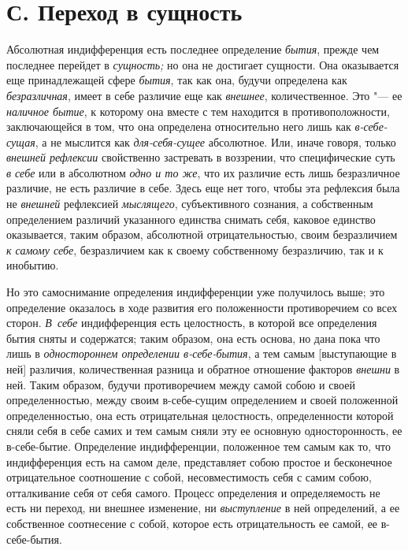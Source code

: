 \section[С. Переход в сущность]{С. Переход в сущность}
Абсолютная индифференция есть последнее
определение {\em бытия}, прежде чем последнее перейдет
в {\em сущность;} но она не достигает сущности. Она
оказывается еще принадлежащей сфере {\em бытия}, так
как она, будучи определена как {\em безразличная},
имеет в себе различие еще как {\em внешнее},
количественное. Это "--- ее {\em наличное бытие}, к
которому она вместе с тем находится в противоположности, заключающейся в
том, что она определена относительно него лишь как
{\em в-себе-сущая}, а не мыслится как
{\em для-себя-сущее} абсолютное. Или, иначе говоря,
только {\em внешней рефлексии} свойственно застревать в
воззрении, что специфические суть {\em в себе} или в
абсолютном {\em одно и то же}, что их различие есть
лишь безразличное различие, не есть различие в себе. Здесь еще нет того,
чтобы эта рефлексия была не {\em внешней} рефлексией
{\em мыслящего}, субъективного сознания, а собственным
определением различий указанного единства снимать себя, каковое единство
оказывается, таким образом, абсолютной отрицательностью, своим безразличием
{\em к самому себе}, безразличием как к своему
собственному безразличию, так и к инобытию.

Но это самоснимание определения индифференции уже получилось выше; это
определение оказалось в ходе развития его положенности противоречием со
всех сторон. {\em В~себе} индифференция есть
целостность, в которой все определения бытия сняты и содержатся; таким
образом, она есть основа, но дана пока что лишь в
{\em одностороннем определении в-себе-бытия}, а тем
самым [выступающие в ней] различия, количественная разница и обратное
отношение факторов {\em внешни} в ней. Таким образом,
будучи противоречием между самой собою и своей определенностью, между своим
в-себе-сущим определением и своей положенной определенностью, она есть
отрицательная целостность, определенности которой сняли себя в себе самих и
тем самым сняли эту ее основную односторонность, ее в-себе-бытие.
Определение индифференции, положенное тем самым как то, что индифференция
есть на самом деле, представляет собою простое и бесконечное отрицательное
соотношение с собой, несовместимость себя с самим собою, отталкивание себя
от себя самого. Процесс определения и определяемость не есть ни переход, ни
внешнее изменение, ни {\em выступление} в ней
определений, а ее собственное соотнесение с собой, которое есть
отрицательность ее самой, ее в-себе-бытия.

